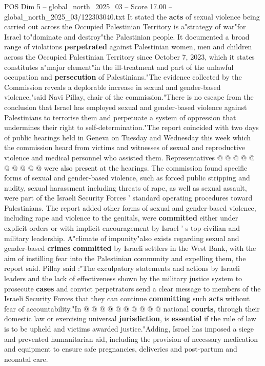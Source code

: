\begin{textsample}{POS Dim 5 – global\_north\_2025\_03 – Score 17.00 – global\_north\_2025\_03/122303040.txt}  \label{ex:f5_pos_155}
It stated the \textbf{acts} of sexual violence being carried out across the Occupied Palestinian Territory is a"strategy of war"for Israel to"dominate and destroy"the Palestinian people.
It documented a broad range of violations \textbf{perpetrated} against Palestinian women, men and children across the Occupied Palestinian Territory since October 7, 2023, which it states constitutes a"major element"in the ill-treatment and part of the unlawful occupation and \textbf{persecution} of Palestinians."The evidence collected by the Commission reveals a deplorable increase in sexual and gender-based violence,"said Navi Pillay, chair of the commission."There is no escape from the conclusion that Israel has employed sexual and gender-based violence against Palestinians to terrorise them and perpetuate a system of oppression that undermines their right to self-determination."The report coincided with two days of public hearings held in Geneva on Tuesday and Wednesday this week which the commission heard from victims and witnesses of sexual and reproductive violence and medical personnel who assisted them.
Representatives @ @ @ @ @ @ @ @ @ @ were also present at the hearings.
The commission found specific forms of sexual and gender-based violence, such as forced public stripping and nudity, sexual harassment including threats of rape, as well as sexual assault, were part of the Israeli Security Forces ' standard operating procedures toward Palestinians.
The report added other forms of sexual and gender-based violence, including rape and violence to the genitals, were \textbf{committed} either under explicit orders or with implicit encouragement by Israel ' s top civilian and military leadership.
A"climate of impunity"also exists regarding sexual and gender-based \textbf{crimes} \textbf{committed} by Israeli settlers in the West Bank, with the aim of instilling fear into the Palestinian community and expelling them, the report said.
Pillay said :"The exculpatory statements and actions by Israeli leaders and the lack of effectiveness shown by the military justice system to prosecute \textbf{cases} and convict perpetrators send a clear message to members of the Israeli Security Forces that they can continue \textbf{committing} such \textbf{acts} without fear of accountability."In @ @ @ @ @ @ @ @ @ @ national \textbf{courts}, through their domestic law or exercising universal \textbf{jurisdiction}, is \textbf{essential} if the rule of law is to be upheld and victims awarded justice."Adding, Israel has imposed a siege and prevented humanitarian aid, including the provision of necessary medication and equipment to ensure safe pregnancies, deliveries and post-partum and neonatal care.

\end{textsample}
